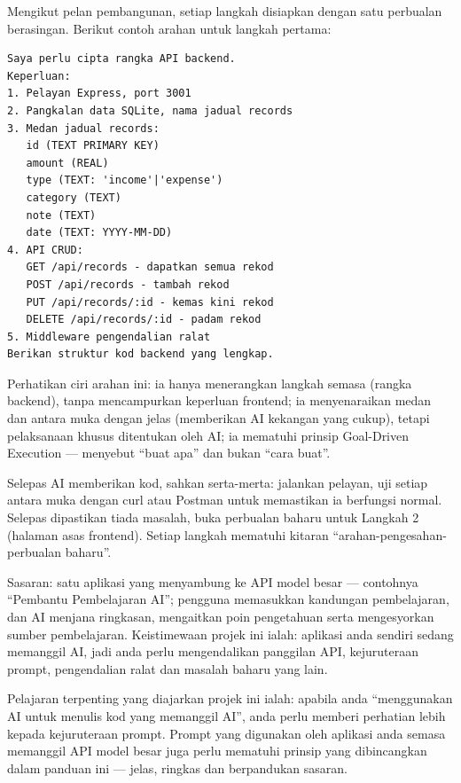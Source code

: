 
Mengikut pelan pembangunan, setiap langkah disiapkan dengan satu perbualan berasingan. Berikut contoh arahan untuk langkah pertama:

\begin{lstlisting}
Saya perlu cipta rangka API backend.
Keperluan:
1. Pelayan Express, port 3001
2. Pangkalan data SQLite, nama jadual records
3. Medan jadual records:
   id (TEXT PRIMARY KEY)
   amount (REAL)
   type (TEXT: 'income'|'expense')
   category (TEXT)
   note (TEXT)
   date (TEXT: YYYY-MM-DD)
4. API CRUD:
   GET /api/records - dapatkan semua rekod
   POST /api/records - tambah rekod
   PUT /api/records/:id - kemas kini rekod
   DELETE /api/records/:id - padam rekod
5. Middleware pengendalian ralat
Berikan struktur kod backend yang lengkap.
\end{lstlisting}

Perhatikan ciri arahan ini: ia hanya menerangkan langkah semasa (rangka backend), tanpa mencampurkan keperluan frontend; ia menyenaraikan medan dan antara muka dengan jelas (memberikan AI kekangan yang cukup), tetapi pelaksanaan khusus ditentukan oleh AI; ia mematuhi prinsip Goal-Driven Execution — menyebut “buat apa” dan bukan “cara buat”.

Selepas AI memberikan kod, sahkan serta-merta: jalankan pelayan, uji setiap antara muka dengan curl atau Postman untuk memastikan ia berfungsi normal. Selepas dipastikan tiada masalah, buka perbualan baharu untuk Langkah 2 (halaman asas frontend). Setiap langkah mematuhi kitaran “arahan-pengesahan-perbualan baharu”.



Sasaran: satu aplikasi yang menyambung ke API model besar — contohnya “Pembantu Pembelajaran AI”; pengguna memasukkan kandungan pembelajaran, dan AI menjana ringkasan, mengaitkan poin pengetahuan serta mengesyorkan sumber pembelajaran. Keistimewaan projek ini ialah: aplikasi anda sendiri sedang memanggil AI, jadi anda perlu mengendalikan panggilan API, kejuruteraan prompt, pengendalian ralat dan masalah baharu yang lain.

Pelajaran terpenting yang diajarkan projek ini ialah: apabila anda “menggunakan AI untuk menulis kod yang memanggil AI”, anda perlu memberi perhatian lebih kepada kejuruteraan prompt. Prompt yang digunakan oleh aplikasi anda semasa memanggil API model besar juga perlu mematuhi prinsip yang dibincangkan dalam panduan ini — jelas, ringkas dan berpandukan sasaran.

